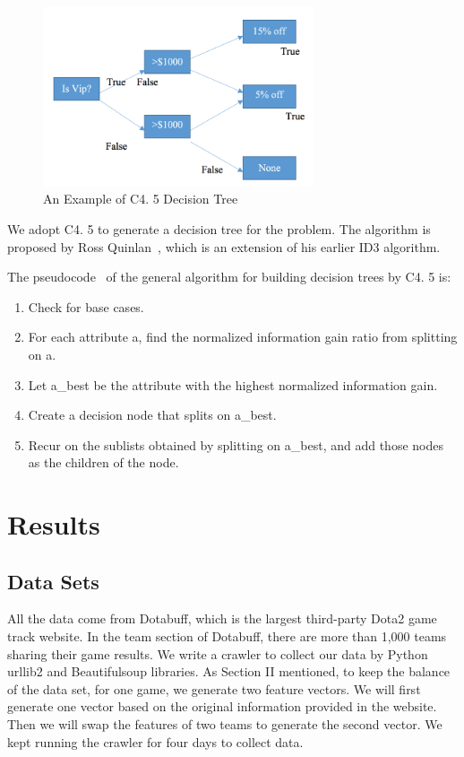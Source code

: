 \documentclass{article}
\begin{document}
\begin{figure}[!htbp]
\centering
\includegraphics[width=8.0cm]{ctree.png} 
\newline
\caption{An Example of C4.
5 Decision Tree}
\label{fig:ctree} 
\end{figure}

We adopt C4.
5 to generate a decision tree for the problem.
 The algorithm is proposed by Ross Quinlan~\cite{quinlan}, which is an extension of his earlier ID3 algorithm.

The pseudocode~\cite{Kotsiantis} of the general algorithm for building decision trees by C4.
5 is: 

\begin{enumerate}
\item Check for base cases.

\item For each attribute a, find the normalized information gain ratio from splitting on a.

\item Let a\_best be the attribute with the highest normalized information gain.

\item Create a decision node that splits on a\_best.

\item Recur on the sublists obtained by splitting on a\_best, and add those nodes as the children of the node.

\end{enumerate}

\section{Results}
\subsection{Data Sets}
All the data come from Dotabuff, which is the largest third-party Dota2 game track website.
In the team section of Dotabuff, there are more than 1,000 teams sharing their game results.
We write a crawler to collect our data by Python urllib2 and Beautifulsoup libraries.
As Section II mentioned, to keep the balance of the data set, for one game, we generate two feature vectors.
We will first generate one vector based on the original information provided in the website.
Then we will swap the features of two teams to generate the second vector.
We kept running the crawler for four days to collect data.
\end{document}
